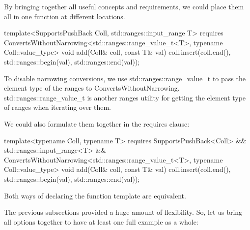 
By bringing together all useful concepts and requirements, we could place them all in one function at different locations.

\begin{cpp}
template<SupportsPushBack Coll, std::ranges::input_range T>
requires ConvertsWithoutNarrowing<std::ranges::range_value_t<T>,
typename Coll::value_type>
void add(Coll& coll, const T& val)
{
	coll.insert(coll.end(),
				std::ranges::begin(val), std::ranges::end(val));
}
\end{cpp}

To disable narrowing conversions, we use std::ranges::range\_value\_t to pass the element type of the ranges to ConvertsWithoutNarrowing. std::ranges::range\_value\_t is another ranges utility for getting the element type of ranges when iterating over them.

We could also formulate them together in the requires clause:

\begin{cpp}
template<typename Coll, typename T>
requires SupportsPushBack<Coll> &&
			std::ranges::input_range<T> &&
			ConvertsWithoutNarrowing<std::ranges::range_value_t<T>,
							typename Coll::value_type>
void add(Coll& coll, const T& val)
{
	coll.insert(coll.end(),
				std::ranges::begin(val), std::ranges::end(val));
}
\end{cpp}

Both ways of declaring the function template are equivalent.


The previous subsections provided a huge amount of flexibility. So, let us bring all options together to have at least one full example as a whole:


